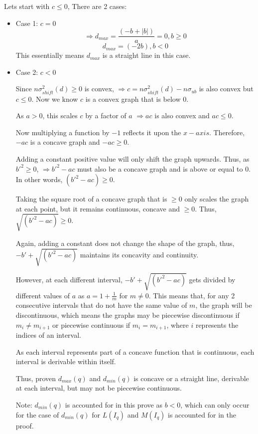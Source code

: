\documentclass[a4paper,12pt]{article}
\begin{document}
Lets start with $c \leq 0$, 
There are 2 cases: 
\begin{itemize}
\item Case 1: $c=0$
$$\Rightarrow  d_{max} = \frac{(-b + |b|)}{a} = 0, b \geq 0$$
			$$  d_{max} =(-2b), b < 0$$
		This essentially means $d_{max}$ is a straight line in this case. 

\item Case 2: $c<0$

Since $n\sigma^2_{shift}(d) \geq 0$ is convex, $\Rightarrow c=n\sigma^2_{shift}(d) - n \sigma_{ub}$ is also convex but $c \leq 0$. Now we know $c$ is a convex graph that is below 0. 

As $a>0$, this scales $c$ by a factor of $a$ $\Rightarrow ac$ is also convex and $ac \leq 0$. 

Now multiplying a function by $-1$ reflects it upon the $x-axis$. Therefore, 
$-ac$ is a concave graph and $-ac \geq 0$.

Adding a constant positive value will only shift the graph upwards. Thus, as $b'^2 \geq 0$, $\Rightarrow b'^2 - ac$ must also be a concave graph and is above or equal to 0. In other words, $(b'^2 - ac) \geq 0$. 

Taking the square root of a concave graph that is $\geq 0$ only scales the graph at each point, but it remains continuous, concave and $\geq 0$. 
Thus, $\sqrt{(b'^2 - ac)} \geq 0$.

Again, adding a constant does not change the shape of the graph, thus, 
$ -b' + \sqrt{(b'^2 - ac)}$ maintains its concavity and continuity. 

However, at each different interval, $ -b' + \sqrt{(b'^2 - ac)}$ gets divided by different values of $a$ as $a = 1  + \frac{1}{m}$ for $m \neq 0$. This means that, 
for any 2 consecutive intervals that do not have the same value of $m$, the graph will be discontinuous, which means the graphs may be piecewise discontinuous if 
$m_{i} \neq m_{i+1}$  or piecewise continuous if $m_{i} = m_{i+1}$, where $i$ represents the indices of an interval. 

As each interval represents part of a concave function that is continuous, each interval is derivable within itself. 

Thus, proven $d_{max}(q)$ and $d_{min}(q)$ is concave or a straight line, derivable at each interval, but may not be piecewise continuous. 

Note: $d_{min}(q)$ is accounted for in this prove as $b<0$, which can only occur for the case of $d_{min}(q)$ for $L(I_{q})$ and $M(I_{q})$ is accounted for in the proof. 


\end{itemize}
\end{document}
